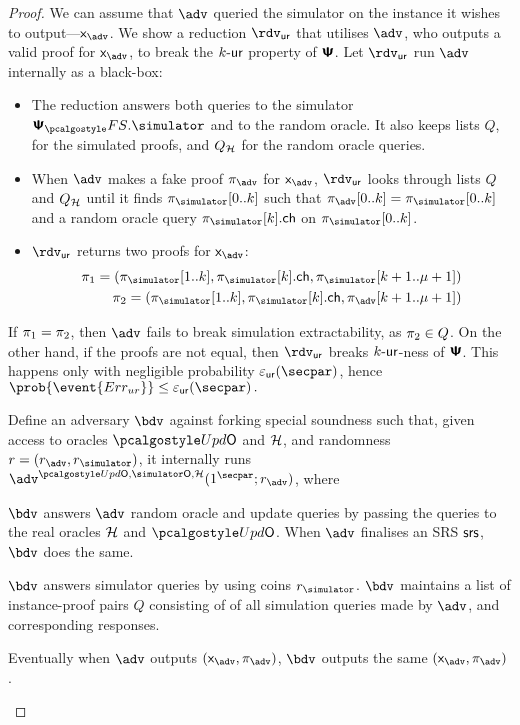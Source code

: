 \begin{proof}
{  We can assume that $\advse$ queried the simulator on the instance it wishes to
  output---$\inp_{\advse}$. We show a reduction $\rdvur$ that utilises $\advse$,
  who outputs a valid proof for $\inp_{\advse}$, to break the ${k\text{-}\mathsf{ur}}$ property of
  $\bm{\mathsf{\Psi}}$. Let $\rdvur$ run $\advse$ internally as a black-box:
\begin{itemize}
	\item The reduction answers both queries to the simulator $\psfs.\simulator$ and to the random oracle. 
	It also keeps lists $Q$, for the simulated proofs, and $Q_{\mathcal{H}}$ for the random oracle queries. 
\item When $\advse$ makes a fake proof $\zkproof_{\advse}$ for $\inp_{\advse}$,
  $\rdvur$ looks through lists $Q$ and $Q_{\mathcal{H}}$ until it finds
  $\zkproof_{\simulator}[0..k]$ such that
  $\zkproof_{\advse}[0..k] = \zkproof_{\simulator}[0..k]$
  and a random oracle query $\zkproof_{\simulator}[k].\ch$ on
  $\zkproof_{\simulator}[0..k]$.
	\item $\rdvur$ returns two proofs for $\inp_{\advse}$:
	\begin{align*}
		\zkproof_1 = (\zkproof_{\simulator}[1..k],
		\zkproof_{\simulator}[k].\ch, \zkproof_{\simulator}[k + 1..\mu + 1])\\
		\zkproof_2 = (\zkproof_{\simulator}[1..k],
		\zkproof_{\simulator}[k].\ch, \zkproof_{\advse}[k + 1..\mu + 1])
	\end{align*}
	\end{itemize}  
	If $\pi_1 = \pi_2$, then $\advse$ fails to break simulation
  extractability, as $\pi_2 \in Q$. On the other hand, if the proofs are
  not equal, then $\rdvur$ breaks ${k\text{-}\mathsf{ur}}$-ness of $\bm{\mathsf{\Psi}}$. This happens only with
  negligible probability $\epsur(\secpar)$, hence \( \prob{\event{\errur}} \leq
  \epsur(\secpar)\,. \)
}
%
 Define an adversary $\bdv$ against forking special soundness such that,
given access to oracles $\initU$ and $\mathcal{H}$, and randomness $r = (r_\adv, \rsim)$, it
internally runs $\advse^{\initU, \simO, \ro} (1^\secpar; r_\adv)$, where
\begin{compactenum}
\item $\bdv$ answers $\adv$ random oracle and update queries by passing the queries to the real
  oracles $\mathcal{H}$ and $\initU$. When $\adv$ finalises an SRS $\mathsf{srs}$, $\bdv$ does the same.
\item $\bdv$ answers simulator queries by using coins $\rsim$. $\bdv$ maintains a
  list of instance-proof pairs $Q$ consisting of of all simulation queries made by
  $\adv$, and corresponding responses.
\item Eventually when $\adv$ outputs $(\inp_\advse, \zkproof_\advse)$, $\bdv$ outputs
  the same $(\inp_\advse, \zkproof_\advse)$.
\end{compactenum}


\end{proof}
